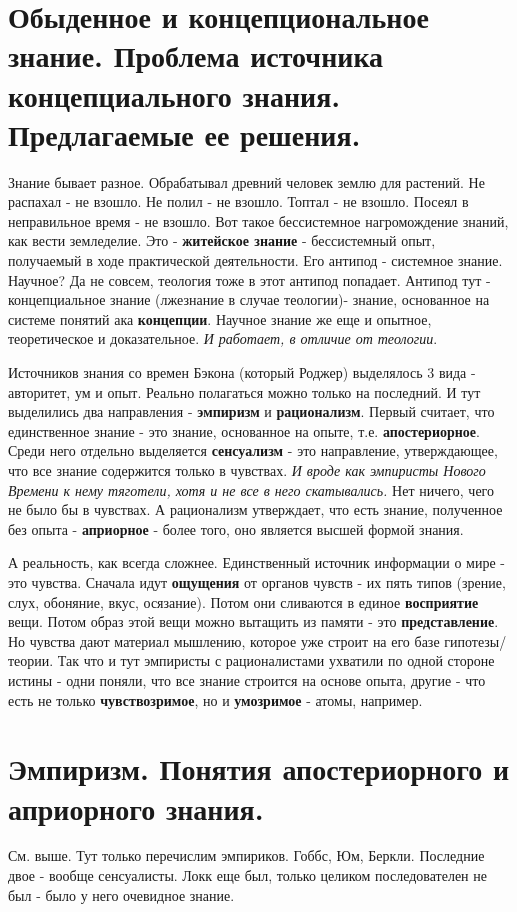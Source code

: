 \section{ Обыденное и концепциональное знание. Проблема источника концепциального знания. Предлагаемые ее решения.}
Знание бывает разное. Обрабатывал древний человек землю для растений. Не распахал - не взошло. Не полил - не взошло. Топтал - не взошло. Посеял в неправильное время - не взошло. Вот такое бессистемное нагромождение знаний, как вести земледелие. Это - \textbf{житейское знание} - бессистемный опыт, получаемый в ходе практической деятельности. Его антипод - системное знание. Научное? Да не совсем, теология тоже в этот антипод попадает. Антипод тут - концепциальное знание (лжезнание в случае теологии)- знание, основанное на системе понятий ака \textbf{концепции}. Научное знание же еще и опытное, теоретическое и доказательное. \textit{И работает, в отличие от теологии}.

Источников знания со времен Бэкона (который Роджер) выделялось 3 вида - авторитет, ум и опыт. Реально полагаться можно только на последний. И тут выделились два направления - \textbf{эмпиризм} и \textbf{рационализм}. Первый считает, что единственное знание - это знание, основанное на опыте, т.е. \textbf{апостериорное}. Среди него отдельно выделяется \textbf{сенсуализм} - это направление, утверждающее, что все знание содержится только в чувствах. \textit{И вроде как эмпиристы Нового Времени к нему тяготели, хотя и не все в него скатывались.} Нет ничего, чего не было бы в чувствах. А рационализм утверждает, что есть знание, полученное без опыта - \textbf{априорное} - более того, оно является высшей формой знания.

А реальность, как всегда сложнее. Единственный источник информации о мире - это чувства. Сначала идут \textbf{ощущения} от органов чувств - их пять типов (зрение, слух, обоняние, вкус, осязание). Потом они сливаются в единое \textbf{восприятие} вещи. Потом образ этой вещи можно вытащить из памяти - это \textbf{представление}. Но чувства дают материал мышлению, которое уже строит на его базе гипотезы/теории. Так что и тут эмпиристы с рационалистами ухватили по одной стороне истины - одни поняли, что все знание строится на основе опыта, другие - что есть не только \textbf{чувствозримое}, но и \textbf{умозримое} - атомы, например.

\section{ Эмпиризм. Понятия апостериорного и априорного знания.}
См. выше. Тут только перечислим эмпириков. Гоббс, Юм, Беркли. Последние двое - вообще сенсуалисты. Локк еще был, только целиком последователен не был - было у него очевидное знание.

